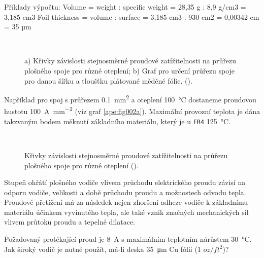       Příklady výpočtu:
      Volume = weight : specific weight = 28,35 g : 8,9 g/cm3 = 3,185 cm3
      Foil thickness = volume : surface = 3,185 cm3 : 930 cm2 = 0,00342 cm = 35 µm


    \begin{figure}[ht!] %
      \centering
        \\
      \caption{a) Křivky závislosti stejnosměrné proudové zatížitelnosti na průřezu plošného spoje 
               pro různé oteplení; b) Graf pro určení průřezu spoje pro danou šířku a tloušťku 
               plátované měděné fólie.
               (\cite[s.~9]{IPC2152}).}
      \label{ape:fig002}
    \end{figure}
    
    Například pro spoj s průřezem \SI{0.1}{\mm\squared} a oteplení \SI{100}{\degreeCelsius} 
    dostaneme proudovou hustotu \SI{100}{\A\per\mm\squared} (viz graf \ref{ape:fig002a}). Maximální 
    provozní teplota je dána takzvaným bodem měknutí základního materiálu, který je u \texttt{FR4} 
    \SI{125}{\degreeCelsius}. 
    
   
    \begin{figure}[ht!] %
      \centering
                                  \\
      \subcaptionbox{Závislost pro průřez vodiče od \SI{0.01}{\mm\squared} do \SI{0.1}{\mm\squared}]
        \label{ape:fig003b}}{\luafigure[1]{ape_fig003b.png}}
      \caption{Křivky závislosti stejnosměrné proudové zatížitelnosti na průřezu plošného spoje 
                pro různé oteplení (\cite[s.~10]{IPC2152}).}
      \label{ape:fig003}
    \end{figure}

    Stupeň ohřátí plošného vodiče vlivem průchodu elektrického proudu závisí na odporu vodiče,
    velikosti a době průchodu proudu a možnostech odvodu tepla. Proudové přetížení má za
    následek nejen zhoršení adheze vodiče k základnímu materiálu účinkem vyvinutého tepla, ale
    také vznik značných mechanických sil vlivem průtoku proudu a tepelné dilatace. 
    
    \begin{example}
      Požadovaný protékající proud je \SI{8}{\A} s maximálním teplotním nárůstem 
      \SI{30}{\degreeCelsius}. Jak široký vodič je nutné použít, má-li deska \SI{35}{\micro\m} Cu 
      fólii (\num{1} \(oz/ft^2\))? 
      
    \end{example}
    
